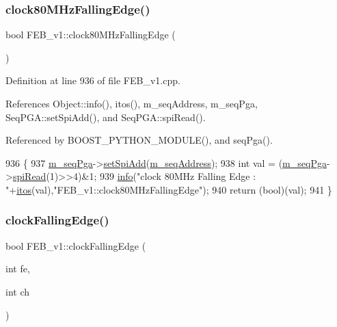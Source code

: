 \subsubsection{\texorpdfstring{clock80\+M\+Hz\+Falling\+Edge()}{clock80MHzFallingEdge()}}
{\footnotesize\ttfamily bool F\+E\+B\+\_\+v1\+::clock80\+M\+Hz\+Falling\+Edge (\begin{DoxyParamCaption}{ }\end{DoxyParamCaption})}



Definition at line 936 of file F\+E\+B\+\_\+v1.\+cpp.



References Object\+::info(), itos(), m\+\_\+seq\+Address, m\+\_\+seq\+Pga, Seq\+P\+G\+A\+::set\+Spi\+Add(), and Seq\+P\+G\+A\+::spi\+Read().



Referenced by B\+O\+O\+S\+T\+\_\+\+P\+Y\+T\+H\+O\+N\+\_\+\+M\+O\+D\+U\+L\+E(), and seq\+Pga().


\begin{DoxyCode}
936                                   \{
937   \hyperlink{classFEB__v1_a6c7804ac86796f233a8393043adf2e77}{m\_seqPga}->\hyperlink{classSeqPGA_ac998ce3a6d9b5f2e88cc8393f8c1df53}{setSpiAdd}(\hyperlink{classFEB__v1_a1c1eb093fd1733b9510fcf8bc5c7ad08}{m\_seqAddress});
938   \textcolor{keywordtype}{int} val = (\hyperlink{classFEB__v1_a6c7804ac86796f233a8393043adf2e77}{m\_seqPga}->\hyperlink{classSeqPGA_ab3d0e5e5d4014bc7a92588a76b8713d4}{spiRead}(1)>>4)&1;
939   \hyperlink{classObject_a644fd329ea4cb85f54fa6846484b84a8}{info}(\textcolor{stringliteral}{"clock 80MHz Falling Edge : "}+\hyperlink{Tools_8h_af330027dbdafb9a30768b3613c553e60}{itos}(val),\textcolor{stringliteral}{"FEB\_v1::clock80MHzFallingEdge"});
940   \textcolor{keywordflow}{return} (\textcolor{keywordtype}{bool})(val);
941 \}
\end{DoxyCode}
\mbox{\label{classFEB__v1_aa9f591714dce594562e3e959b105a580}} 
\subsubsection{\texorpdfstring{clock\+Falling\+Edge()}{clockFallingEdge()}}
{\footnotesize\ttfamily bool F\+E\+B\+\_\+v1\+::clock\+Falling\+Edge (\begin{DoxyParamCaption}\item[{int}]{fe,  }\item[{int}]{ch }\end{DoxyParamCaption})}



